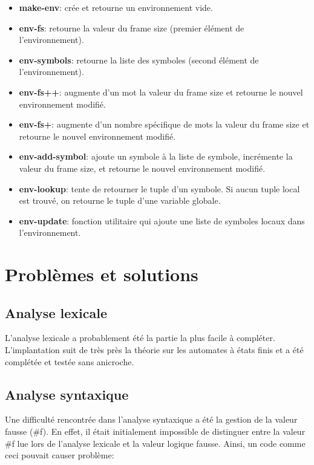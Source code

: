 \documentclass[11pt]{report}
\begin{document}
\begin{itemize}
\item {\bf make-env}: crée et retourne un environnement vide.
\item {\bf env-fs}: retourne la valeur du frame size (premier élément
  de l'environnement).
\item {\bf env-symbols}: retourne la liste des symboles (second
  élément de l'environnement).
\item {\bf env-fs++}: augmente d'un mot la valeur du frame size et
  retourne le nouvel environnement modifié.
\item {\bf env-fs+}: augmente d'un nombre spécifique de mots la valeur
  du frame size et retourne le nouvel environnement modifié.
\item {\bf env-add-symbol}: ajoute un symbole à la liste de symbole,
  incrémente la valeur du frame size, et retourne le nouvel
  environnement modifié.
\item {\bf env-lookup}: tente de retourner le tuple d'un symbole. Si
  aucun tuple local est trouvé, on retourne le tuple d'une variable
  globale.
\item {\bf env-update}: fonction utilitaire qui ajoute une liste de
  symboles locaux dans l'environnement.
\end{itemize}



\chapter{Problèmes et solutions}

\section{Analyse lexicale}

L'analyse lexicale a probablement été la partie la plus facile à
compléter. L'implantation suit de très près la théorie sur les
automates à états finis et a été complétée et testée sans anicroche.

\section{Analyse syntaxique}

Une difficulté rencontrée dans l'analyse syntaxique a été la gestion
de la valeur fausse (\#f).  En effet, il était initialement impossible
de distinguer entre la valeur \#f lue lors de l'analyse lexicale et la
valeur logique fausse.  Ainsi, un code comme ceci pouvait causer
problème:
\end{document}
